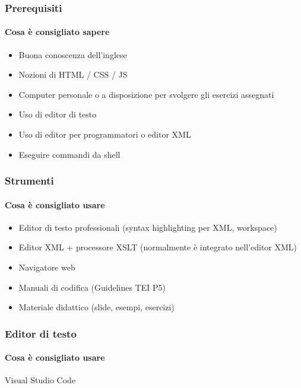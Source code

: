



\begin{frame}
	\frametitle{Prerequisiti}
	\framesubtitle{Cosa è consigliato sapere}
	\addtocounter{nframe}{1}

	\begin{itemize}
		\item Buona conoscenza dell’inglese
		\item Nozioni di HTML / CSS / JS
		\item Computer personale o a disposizione per svolgere gli esercizi assegnati
		\item Uso di editor di testo
		\item Uso di editor per programmatori o editor XML
		\item Eseguire commandi da shell
	\end{itemize}

\end{frame}

\begin{frame}
	\frametitle{Strumenti}
	\framesubtitle{Cosa è consigliato usare}
	\addtocounter{nframe}{1}

	\begin{itemize}
		\item Editor di testo professionali (syntax highlighting per XML, workspace)
		\item Editor XML + processore XSLT (normalmente è integrato
		      nell’editor XML)
		\item Navigatore web
		\item Manuali di codifica (Guidelines TEI P5)
		\item Materiale didattico (slide, esempi, esercizi)
	\end{itemize}

\end{frame}

\begin{frame}
	\frametitle{Editor di testo}
	\framesubtitle{Cosa è consigliato usare}
	\addtocounter{nframe}{1}

	\begin{block}{Visual Studio Code}

	\end{block}

\end{frame}


